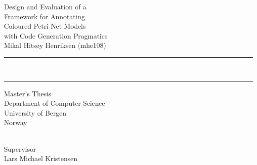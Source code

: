 \documentclass[twoside, 11pt, openright]{report}
\newcommand{\clearemptydoublepage}{\newpage{\pagestyle{empty}\cleardoublepage}}
\begin{document}
\pagestyle{empty}

\vspace*{\fill}
\begin{flushright}
  {\Huge\sf Design and Evaluation of a}\\[2ex]
  {\Huge\sf Framework for Annotating}\\[2ex]
  {\Huge\sf Coloured Petri Net Models}\\[2ex]
  {\Huge\sf with Code Generation Pragmatics}\\[4ex]
  {\huge\sf Mikal Hitsøy Henriksen (mhe108)} 
\end{flushright}
\noindent\rule{\linewidth}{1mm}\\[-.5ex]
\noindent\rule{\linewidth}{2.5mm}
\vfill
\begin{center}
  {\huge\sf Master's Thesis}\\[\fill]
  {\sf Department of Computer Science\\University of Bergen\\Norway}
\end{center}
\begin{center}
  {\sf \makeatletter\@date\makeatother\\Supervisor\\Lars Michael Kristensen}
\end{center}
\vspace*{\fill}
\clearemptydoublepage





\clearpage
\tableofcontents
\clearemptydoublepage



\pagestyle{headings}
\setcounter{page}{1}




\end{document}
